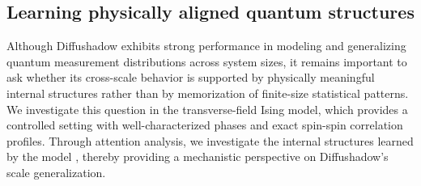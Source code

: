 \documentclass[pdflatex,sn-mathphys-num]{sn-jnl}%
\theoremstyle{thmstyleone}%
\theoremstyle{thmstyletwo}%
\theoremstyle{thmstylethree}%
\begin{document}



\subsection{Learning physically aligned quantum structures}


Although Diffushadow exhibits strong performance in modeling and generalizing quantum measurement distributions across system sizes, it remains important to ask whether its cross-scale behavior is supported by physically meaningful internal structures rather than by memorization of finite-size statistical patterns. We investigate this question in the transverse-field Ising model, which provides a controlled setting with well-characterized phases and exact spin-spin correlation profiles. Through attention analysis, we investigate the internal structures learned by the model \cite{clark2019does}, thereby providing a mechanistic perspective on Diffushadow's scale generalization. 
\end{document}
